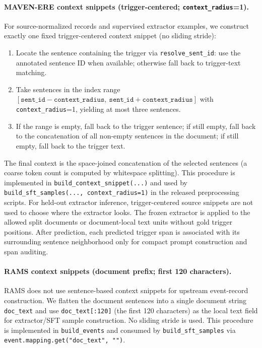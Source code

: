 \documentclass{article}
\begin{document}
\paragraph{MAVEN-ERE context snippets (trigger-centered; \texttt{context\_radius}=1).}
For source-normalized records and supervised extractor examples, we construct exactly one fixed trigger-centered context snippet (no sliding stride):
\begin{enumerate}
    \item Locate the sentence containing the trigger via \texttt{resolve\_sent\_id}: use the annotated sentence ID when available; otherwise fall back to trigger-text matching.
    \item Take sentences in the index range
     $[\texttt{sent\_id}-\texttt{context\_radius},\ \texttt{sent\_id}+\texttt{context\_radius}]$
     with \texttt{context\_radius}=1, yielding at most three sentences.
    \item If the range is empty, fall back to the trigger sentence; if still empty, fall back to the concatenation of all non-empty sentences in the document; if still empty, fall back to the trigger text.
\end{enumerate}
The final context is the space-joined concatenation of the selected sentences (a coarse token count is computed by whitespace splitting).
This procedure is implemented in \texttt{build\_context\_snippet(...)} and used by
\texttt{build\_sft\_samples(..., context\_radius=1)} in the released preprocessing scripts.
For held-out extractor inference, trigger-centered source snippets are not used to choose where the extractor looks.
The frozen extractor is applied to the allowed split documents or document-local text units without gold trigger positions.
After prediction, each predicted trigger span is associated with its surrounding sentence neighborhood only for compact prompt construction and span auditing.

\paragraph{RAMS context snippets (document prefix; first 120 characters).}
RAMS does not use sentence-based context snippets for upstream event-record construction.
We flatten the document sentences into a single document string \texttt{doc\_text} and use \texttt{doc\_text[:120]} (the first 120 characters) as the local text field for extractor/SFT sample construction.
No sliding stride is used.
This procedure is implemented in \texttt{build\_events} and consumed by \texttt{build\_sft\_samples} via \texttt{event.mapping.get("doc\_text", "")}.
\end{document}

